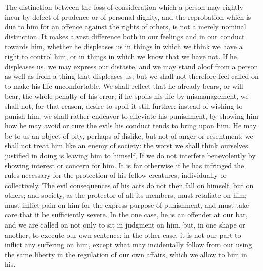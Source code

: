 \documentclass[12pt]{report}
\begin{document}
The distinction between the loss of consideration which a person may rightly incur by defect of prudence or of personal dignity, and the reprobation which is due to him for an offence against the rights of others, is not a merely nominal distinction. It makes a vast difference both in our feelings and in our conduct towards him, whether he displeases us in things in which we think we have a right to control him, or in things in which we know that we have not. If he displeases us, we may express our distaste, and we may stand aloof from a person as well as from a thing that displeases us; but we shall not therefore feel called on to make his life uncomfortable. We shall reflect that he already bears, or will bear, the whole penalty of his error; if he spoils his life by mismanagement, we shall not, for that reason, desire to spoil it still further: instead of wishing to punish him, we shall rather endeavor to alleviate his punishment, by showing him how he may avoid or cure the evils his conduct tends to bring upon him. He may be to us an object of pity, perhaps of dislike, but not of anger or resentment; we shall not treat him like an enemy of society: the worst we shall think ourselves justified in doing is leaving him to himself, If we do not interfere benevolently by showing interest or concern for him. It is far otherwise if he has infringed the rules necessary for the protection of his fellow-creatures, individually or collectively. The evil consequences of his acts do not then fall on himself, but on others; and society, as the protector of all its members, must retaliate on him; must inflict pain on him for the express purpose of punishment, and must take care that it be sufficiently severe. In the one case, he is an offender at our bar, and we are called on not only to sit in judgment on him, but, in one shape or another, to execute our own sentence: in the other case, it is not our part to inflict any suffering on him, except what may incidentally follow from our using the same liberty in the regulation of our own affairs, which we allow to him in his.
\end{document}

